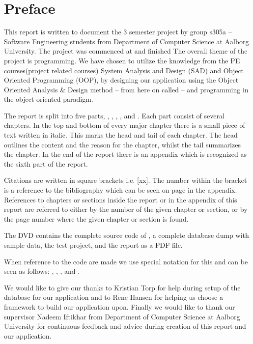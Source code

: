 \chapter*{Preface}
\label{chap:preface}
%
\emptyTop{}%
\vspace{-15mm}%
This report is written to document the 3\rd{} semester project by group s305a -- Software Engineering students from Department of Computer Science at Aalborg University. 
The project was commenced at  and finished 
The overall theme of the project is programming. 
We have chosen to utilize the knowledge from the PE courses(project related courses) System Analysis and Design (SAD) and Object Oriented Programming (OOP), by designing our application using the Object Oriented Analysis \& Design method -- from here on called \ooad[] -- and programming \hdesk[] in the object oriented paradigm.  

The report is split into five parts, , , , , and . Each part consist of several chapters. In the top and bottom of every major chapter there is a small piece of text written in italic. This marks the head and tail of each chapter. The head outlines the content and the reason for the chapter, whilst the tail summarizes the chapter.
In the end of the report there is an appendix which is recognized as the sixth part of the report.

Citations are written in square brackets i.e. [xx]. The number within the bracket is a reference to the bibliography which can be seen on page \pageref{chap:bib} in the appendix.
References to chapters or sections inside the report or in the appendix of this report are referred to either by the number of the given chapter or section, or by the page number where the given chapter or section is found.

The DVD contains the complete source code of \hdesk[], a complete database dump with sample data, the test project, and the report as a PDF file.  

When reference to the code are made we use special notation for this and can be seen as follows: , , ,  and .

We would like to give our thanks to Kristian Torp for help during setup of the database for our application and to Rene Hansen for helping us choose a framework to build our application upon.
Finally we would like to thank our supervisor Nadeem Iftikhar from Department of Computer Science at Aalborg University for continuous feedback and advice during creation of this report and our application.